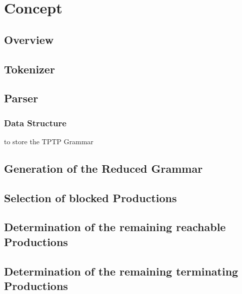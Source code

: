 
\chapter{Concept}\label{cha:Concept}
\section{Overview}\label{sec:ConceptOverview}

\section{Tokenizer}
\section{Parser}
\subsection{Data Structure}
to store the \ac{TPTP} Grammar
\section{Generation of the Reduced Grammar}\label{sec:ConceptGenerateReducedGrammar}

\section{Selection of blocked Productions}

\section{Determination of the remaining reachable Productions}

\section{Determination of  the remaining terminating Productions}


